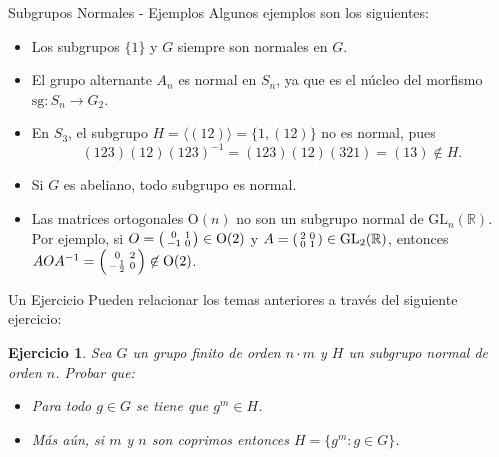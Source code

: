 \documentclass{beamer}
\def\R{\mathbb{R}}
\def\GL{\mathrm{GL}}
\def\sg{\mathrm{sg}}
\newtheorem{ejercicio}[teorema]{Ejercicio}
\newenvironment{psmallmatrix}
  {\left(\begin{smallmatrix}}
  {\end{smallmatrix}\right)}
\begin{document}
\begin{frame}{Subgrupos Normales - Ejemplos}
Algunos ejemplos son los siguientes:
\begin{itemize}
 \item Los subgrupos $\{1\}$ y $G$ siempre son normales en $G$.
\item El grupo alternante $A_n$ es normal en $S_n$, ya que es el núcleo del morfismo $\sg: S_n\to G_2$.
 \item En $S_3$, el subgrupo $H = \langle (12) \rangle = \{1,(12)\}$ \alert{no} es normal, pues
\[
(123)(12)(123)^{-1} = (123)(12)(321) = (13) \not \in H.
\]
 \item Si $G$ es abeliano, todo subgrupo es normal.
 \item Las matrices ortogonales $\mathrm{O}(n)$ \alert{no} son un subgrupo normal de $\GL_n(\R)$. Por ejemplo, si $O = \begin{psmallmatrix}
0 & 1\\
-1 &0\\
\end{psmallmatrix} \in \mathrm{O}(2)$ y $A = \begin{psmallmatrix}
2 & 0\\
0 &1\\
\end{psmallmatrix} \in \GL_2(\R)$, entonces $AOA^{-1} = \begin{psmallmatrix}
0 & 2\\
-\frac{1}{2} &0\\
\end{psmallmatrix} \not \in \mathrm{O}(2)$.
\end{itemize}
\end{frame}

\begin{frame}{Un Ejercicio}
Pueden relacionar los temas anteriores a través del siguiente ejercicio:
\medskip
\begin{ejercicio} Sea $G$ un grupo finito de orden $n \cdot m$ y $H$ un subgrupo normal de orden $n$. Probar que: 
\begin{itemize}
\item[(i)] Para todo $g \in G$ se tiene que $g^m \in H$.
\item[(ii)] Más aún, si $m$ y $n$ son coprimos entonces $H = \{g^m : g \in G\}$.
\end{itemize}
\end{ejercicio}
\end{frame}
  
\end{document}
